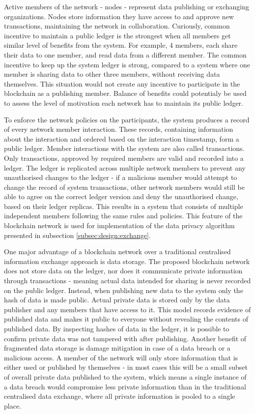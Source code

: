 \documentclass[12pt]{article}
\begin{document}
    Active members of the network - nodes - represent data publishing or exchanging organizations. Nodes store information  they have access to and approve new transactions, maintaining the network in collaboration. Curiously, common incentive to maintain a public ledger is the strongest when all members get similar level of benefits from the system. For example, 4 members, each share their data to one member, and read data from a different member. The common incentive to keep up the system ledger is strong, compared to a system where one member is sharing data to other three members, without receiving data themselves. This situation would not create any incentive to participate in the blockchain as a publishing member. Balance of benefits could potentialy be used to assess the level of motivation each network has to maintain its public ledger.
    
    To enforce the network policies on the participants, the system produces a record of every network member interaction. These records, containing information about the interaction and ordered based on the interaction timestamp, form a public ledger. Member interactions with the system are also called transactions. Only transactions, approved by required members are valid and recorded into a ledger. The ledger is replicated across multiple network members to prevent any unauthorised changes to the ledger - if a malicious member would attempt to change the record of system transactions, other network members would still be able to agree on the correct ledger version and deny the unauthorised change, based on their ledger replicas. This results in a system that consists of multiple independent members following the same rules and policies. This feature of the blockchain network is used for implementation of the data privacy algorithm presented in subsection \ref{subsec:design:exchange}.
    
    One major advantage of a blockchain network over a traditional centralised information exchange approach is data storage. The proposed blockchain network does not store data on the ledger, nor does it communicate private information through transactions - meaning actual data intended for sharing is never recorded on the public ledger. Instead, when publishing new data to the system only the hash of data is made public. Actual private data is stored only by the data publisher and any members that have access to it. This model records evidence of published data and makes it public to everyone without revealing the contents of published data. By inspecting hashes of data in the ledger, it is possible to confirm private data was not tampered with after publishing. Another benefit of fragmented data storage is damage mitigation in case of a data breach or a malicious access. A member of the network will only store information that is either used or published by themselves - in most cases this will be a small subset of overall private data published to the system, which means a single instance of a data breach would compromise less private information than in the traditional centralised data exchange, where all private information is pooled to a single place.
    
\end{document}
